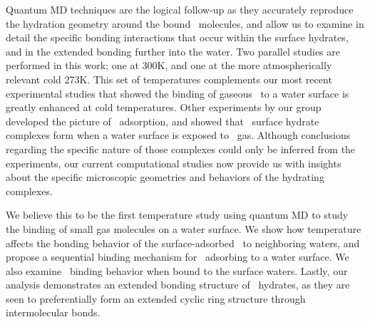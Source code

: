 
Quantum MD techniques are the logical follow-up as they accurately reproduce the hydration geometry around the bound \suldiox~molecules, and allow us to examine in detail the specific bonding interactions that occur within the surface hydrates, and in the extended bonding further into the water.\cite{Baer2010} Two parallel studies are performed in this work; one at 300K, and one at the more atmospherically relevant cold 273K. This set of temperatures complements our most recent experimental studies that showed the binding of gaseous \suldiox~to a water surface is greatly enhanced at cold temperatures.\cite{Ota2011} Other experiments by our group developed the picture of \suldiox~adsorption, and showed that \suldiox~surface hydrate complexes form when a water surface is exposed to \suldiox~gas.\cite{Tarbuck2005,Tarbuck2006} Although conclusions regarding the specific nature of those complexes could only be inferred from the experiments, our current computational studies now provide us with insights about the specific microscopic geometries and behaviors of the hydrating complexes.

We believe this to be the first temperature study using quantum MD to study the binding of small gas molecules on a water surface. We show how temperature affects the bonding behavior of the surface-adsorbed \suldiox~to neighboring waters, and propose a sequential binding mechanism for \suldiox~adsorbing to a water surface. We also examine \suldiox~binding behavior when bound to the surface waters. Lastly, our analysis demonstrates an extended bonding structure of \suldiox~hydrates, as they are seen to preferentially form an extended cyclic ring structure through intermolecular bonds.

